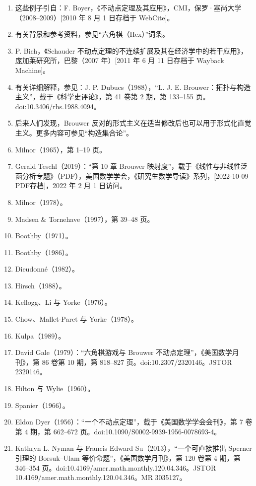 \begin{enumerate}
\item 这些例子引自：F. Boyer，《不动点定理及其应用》，CMI，保罗·塞尚大学（2008–2009）[2010 年 8 月 1 日存档于 WebCite]。
\item 有关背景和参考资料，参见“六角棋（Hex）”词条。
\item P. Bich，《Schauder 不动点定理的不连续扩展及其在经济学中的若干应用》，庞加莱研究所，巴黎（2007 年）[2011 年 6 月 11 日存档于 Wayback Machine]。
\item 有关详细解释，参见：J. P. Dubucs（1988），“L. J. E. Brouwer：拓扑与构造主义”，载于《科学史评论》，第 41 卷第 2 期，第 133–155 页。doi:10.3406/rhs.1988.4094。
\item 后来人们发现，Brouwer 反对的形式主义在适当修改后也可以用于形式化直觉主义。更多内容可参见“构造集合论”。
\item Milnor（1965），第 1–19 页。
\item Gerald Teschl（2019）：“第 10 章 Brouwer 映射度”，载于《线性与非线性泛函分析专题》（PDF），美国数学学会，《研究生数学导读》系列，[2022-10-09 PDF存档]，2022 年 2 月 1 日访问。
\item Milnor（1978）。
\item Madsen & Tornehave（1997），第 39–48 页。
\item Boothby（1971）。
\item Boothby（1986）。
\item Dieudonné（1982）。
\item Hirsch（1988）。
\item Kellogg、Li 与 Yorke（1976）。
\item Chow、Mallet-Paret 与 Yorke（1978）。
\item Kulpa（1989）。
\item David Gale（1979）：“六角棋游戏与 Brouwer 不动点定理”，《美国数学月刊》，第 86 卷第 10 期，第 818–827 页。doi:10.2307/2320146。JSTOR 2320146。
\item Hilton 与 Wylie（1960）。
\item Spanier（1966）。
\item Eldon Dyer（1956）：“一个不动点定理”，载于《美国数学学会会刊》，第 7 卷第 4 期，第 662–672 页。doi:10.1090/S0002-9939-1956-0078693-4。
\item Kathryn L. Nyman 与 Francis Edward Su（2013），“一个可直接推出 Sperner 引理的 Borsuk–Ulam 等价命题”，《美国数学月刊》，第 120 卷第 4 期，第 346–354 页。doi:10.4169/amer.math.monthly.120.04.346。JSTOR 10.4169/amer.math.monthly.120.04.346。MR 3035127。
\end{enumerate}
